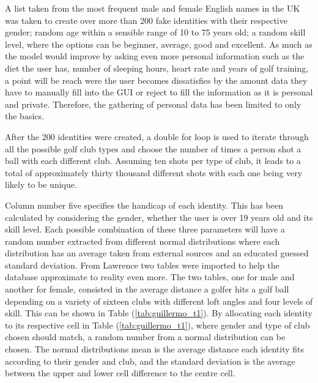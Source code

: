 \documentclass[11pt,landscape]{article}
\begin{document}
\begin{multicols}{3}
A list taken from the most frequent male and female English names in the UK was
taken to create over more than 200 fake identities with their respective gender;
random age within a sensible range of 10 to 75 years old; a random skill level,
where the options can be beginner, average, good and excellent. As much as the
model would improve by asking even more personal information such as the diet
the user has, number of sleeping hours, heart rate and years of golf training, a
point will be reach were the user becomes dissatisfies by the amount data they have
to manually fill into the GUI or reject to fill the information as it is
personal and private. Therefore, the gathering of personal data has been limited
to only the basics.

After the 200 identities were created, a double for loop is used to iterate
through all the possible golf club types and choose the number of times a person
shot a ball with each different club. Assuming ten shots per type of club, it
leads to a total of approximately thirty thousand different shots with each one
being very likely to be unique. 

Column number five specifies the handicap of each identity. This has been
calculated by considering the gender, whether the user is over 19 years old and
its skill level. Each possible combination of these three parameters will have a
random number extracted from different normal distributions where each
distribution has an average taken from external sources and an educated guessed
standard deviation. From Lawrence \cite{golf_charts} two tables were imported to
help the database approximate to reality even more. The two tables, one for male
and another for female, consisted in the average distance a golfer hits a golf
ball depending on a variety of sixteen clubs with different loft angles and four
levels of skill. This can be shown in Table (\ref{tab:guillermo_t1}). By
allocating each identity to its respective cell in Table
(\ref{tab:guillermo_t1}), where gender and type of club chosen should match,
a random number from a normal distribution can be chosen. The normal
distributions mean is the average distance each identity fits according to their
gender and club, and the standard deviation is the average between the upper and
lower cell difference to the centre cell. 


\end{multicols}
\end{document}
